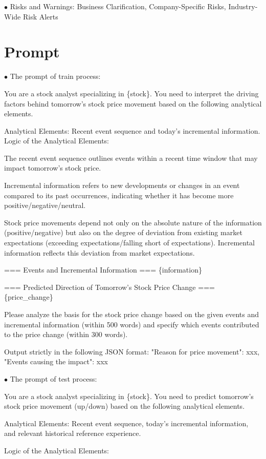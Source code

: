 \documentclass[sigconf, nonacm]{acmart} %
\begin{document}
$\bullet$ Risks and Warnings: Business Clarification, Company-Specific Risks, Industry-Wide Risk Alerts


\section{Prompt}
$\bullet$ The prompt of train process:

You are a stock analyst specializing in \{stock\}. You need to interpret the driving factors behind tomorrow's stock price movement based on the following analytical elements.

Analytical Elements: Recent event sequence and today's incremental information.
Logic of the Analytical Elements:

The recent event sequence outlines events within a recent time window that may impact tomorrow's stock price.

Incremental information refers to new developments or changes in an event compared to its past occurrences, indicating whether it has become more positive/negative/neutral.

Stock price movements depend not only on the absolute nature of the information (positive/negative) but also on the degree of deviation from existing market expectations (exceeding expectations/falling short of expectations). Incremental information reflects this deviation from market expectations.

=== Events and Incremental Information ===
\{information\}

=== Predicted Direction of Tomorrow's Stock Price Change ===
\{price\_change\}

Please analyze the basis for the stock price change based on the given events and incremental information (within 500 words) and specify which events contributed to the price change (within 300 words).

Output strictly in the following JSON format:
{{"Reason for price movement": xxx, "Events causing the impact": xxx}}

$\bullet$ The prompt of test process:

You are a stock analyst specializing in \{stock\}. You need to predict tomorrow's stock price movement (up/down) based on the following analytical elements.

Analytical Elements: Recent event sequence, today's incremental information, and relevant historical reference experience.

Logic of the Analytical Elements:
\end{document}
